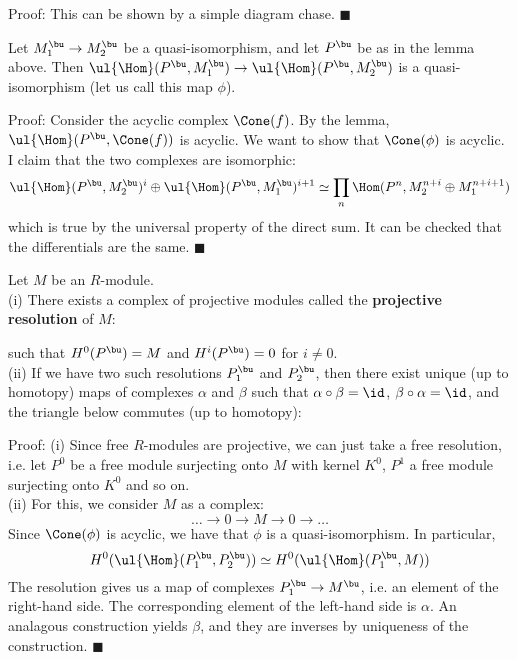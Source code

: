 \documentclass[10 pt]{article}
\newtheorem{cor}{Corollary}[section]
\newtheorem{lem}{Lemma}[section]
\newtheorem{prop}{Proposition}[section]
\newtheorem{propconstr}{Proposition-Construction}[section]
\newcommand\begin{lemma}{\begin{lem}}
\newcommand\begin{proposition}{\begin{prop}}
\newcommand\begin{proof}{\begin{proof}}
\newcommand\begin{corollary}{\begin{cor}}
\newcommand\begin{proposition}constr{\begin{propconstr}}
\newcommand\end{definition}{\end{defn}}
\newcommand\end{lemma}{\end{lem}}
\newcommand\end{corollary}{\end{cor}}
\newcommand\end{proposition}{\end{prop}}
\newcommand\end{proof}{\end{proof}}
\newcommand\end{proposition}constr{\end{propconstr}}
\begin{document}
Proof: This can be shown by a simple diagram chase. $\blacksquare$

\begin{corollary} Let $M_1^\bu\rightarrow M_2^\bu$ be a quasi-isomorphism, and let $P^\bu$ be as in the lemma above.  Then $\ul{\Hom}(P^\bu,M_1^\bu)\rightarrow \ul{\Hom}(P^\bu,M_2^\bu)$ is a quasi-isomorphism (let us call this map $\phi$). \end{corollary}

Proof: Consider the acyclic complex $\Cone(f)$.  By the lemma, $\ul{\Hom}(P^\bu,\Cone(f))$ is acyclic.  We want to show that $\Cone(\phi)$ is acyclic.  I claim that the two complexes are isomorphic:
$$\ul{\Hom}(P^\bu,M_2^\bu)^i\oplus \ul{\Hom}(P^\bu,M_1^\bu)^{i+1}\simeq \prod_n \Hom(P^n,M_2^{n+i}\oplus M_1^{n+i+1})$$
which is true by the universal property of the direct sum.  It can be checked that the differentials are the same. $\blacksquare$

\begin{proposition} Let $M$ be an $R$-module.\\
(i)  There exists a complex of projective modules called the {\bf projective resolution} of $M$:\\

such that $H^0(P^\bu)=M$ and $H^i(P^\bu)=0$ for $i\neq 0$.\\

(ii)  If we have two such resolutions $P_1^\bu$ and $P_2^\bu$, then there exist unique (up to homotopy) maps of complexes $\alpha$ and $\beta$ such that $\alpha\circ\beta=\id$, $\beta\circ \alpha=\id$, and the triangle below commutes (up to homotopy):\\
\end{proposition}

Proof: (i) Since free $R$-modules are projective, we can just take a free resolution, i.e. let $P^0$ be a free module surjecting onto $M$ with kernel $K^0$, $P^1$ a free module surjecting onto $K^0$ and so on.\\
(ii) For this, we consider $M$ as a complex:
$$\dots\rightarrow 0\rightarrow M\rightarrow 0\rightarrow \dots$$
Since $\Cone (\phi)$ is acyclic, we have that $\phi$ is a quasi-isomorphism.  In particular,
$$H^0(\ul{\Hom}(P_1^\bu,P_2^\bu))\simeq H^0(\ul{\Hom}(P_1^\bu,M))$$
The resolution gives us a map of complexes $P_1^\bu\rightarrow M^\bu$, i.e. an element of the right-hand side.  The corresponding element of the left-hand side is $\alpha$.  An analagous construction yields $\beta$, and they are inverses by uniqueness of the construction. $\blacksquare$
\end{document}
